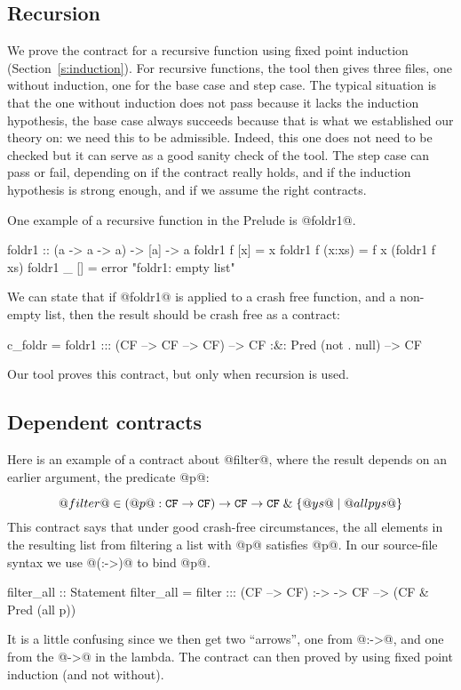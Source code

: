 \subsection{Recursion}

We prove the contract for a recursive function 
using fixed point induction (Section~\ref{s:induction}). 
For recursive
functions, the tool then gives three files, one without induction, one
for the base case and step case. The typical situation is that the one
without induction does not pass because it lacks the induction
hypothesis, the base case always succeeds because that is what we
established our theory on: we need this to be admissible. Indeed, this
one does not need to be checked but it can serve as a good sanity
check of the tool. The step case can pass or fail, depending on if the
contract really holds, and if the induction hypothesis is strong
enough, and if we assume the right contracts.

One example of a recursive function in the Prelude is @foldr1@.

\begin{code}
foldr1          :: (a -> a -> a) -> [a] -> a
foldr1 f [x]    =  x
foldr1 f (x:xs) =  f x (foldr1 f xs)
foldr1 _ []     =  error "foldr1: empty list"
\end{code}

We can state that if @foldr1@ is applied to a crash free function, and
a non-empty list, then the result should be crash free as a contract:

\begin{code}
c_foldr = foldr1 ::: (CF --> CF --> CF) -->
                 CF :&: Pred (not . null) --> CF
\end{code}

Our tool proves this contract, but only when recursion is used.

\subsection{Dependent contracts}

Here is an example of a contract about @filter@,
where the result depends on an earlier argument, the predicate @p@:

\[
@filter@ \in (@p@ : {\tt CF} \rightarrow {\tt CF}) \rightarrow
             {\tt CF} \rightarrow {\tt CF} \;\&\; \{@ys@ \mid @all p ys@ \}
\]
This contract says that under good crash-free circumstances, the
all elements in the resulting list from filtering a list with @p@
satisfies @p@.
In our source-file syntax we use @(:->)@ to bind @p@.
\begin{code}
filter_all :: Statement
filter_all = filter ::: (CF --> CF) :-> \p ->
                        CF --> (CF & Pred (all p))
\end{code}
It is a little confusing since we then get two ``arrows'', one from
@:->@, and one from the @->@ in the lambda.
The contract can then proved by using fixed point induction (and not without).

